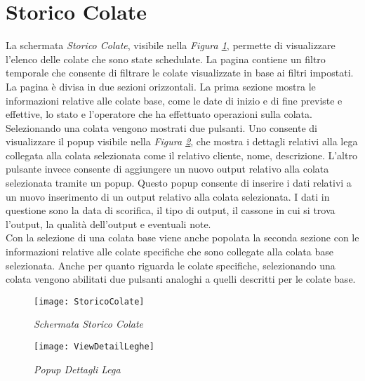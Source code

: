   \section{Storico Colate}
  La schermata \textit{Storico Colate}, visibile nella \textit{Figura \ref{fig:StoricoColate}}, permette di visualizzare
  l'elenco delle colate che sono state schedulate. La pagina contiene un filtro temporale che consente di filtrare
  le colate visualizzate in base ai filtri impostati. La pagina è divisa in due sezioni orizzontali. La prima sezione
  mostra le informazioni relative alle colate base,
  come le date di inizio e di fine previste e effettive, lo stato e l'operatore che ha effettuato operazioni sulla colata.
  Selezionando una colata vengono mostrati due pulsanti. Uno consente di visualizzare il popup visibile 
  nella \textit{Figura \ref{fig:ViewDetailLeghe}},
  che mostra i dettagli relativi alla lega collegata alla colata selezionata come il relativo cliente, nome, descrizione. 
  L'altro pulsante invece consente di aggiungere un nuovo output relativo alla colata selezionata tramite un popup. 
  Questo popup consente di inserire i dati relativi a un nuovo inserimento di un output relativo alla
  colata selezionata. I dati in questione sono la data di scorifica, il tipo di output, il cassone in cui si trova l'output,
  la qualità dell'output e eventuali note.\\
  Con la selezione di una colata base viene anche popolata la seconda sezione con le informazioni relative alle colate specifiche
  che sono collegate alla colata base selezionata. Anche per quanto riguarda le colate specifiche, selezionando 
  una colata vengono abilitati due pulsanti analoghi a quelli descritti per le colate base.
  
  \begin{figure}[H]
    \texttt{[image: StoricoColate]}
    \centering
    \caption{\textit{Schermata Storico Colate}}
    \label{fig:StoricoColate}
  \end{figure}

  \begin{figure}[H]
    \texttt{[image: ViewDetailLeghe]}
    \centering
    \caption{\textit{Popup Dettagli Lega}}
    \label{fig:ViewDetailLeghe}
  \end{figure}
  
